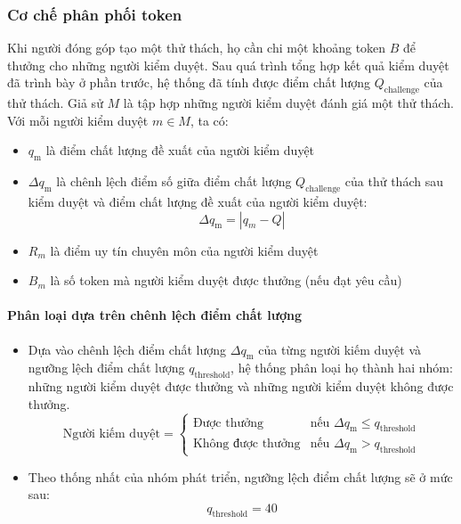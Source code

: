 \subsubsection{Cơ chế phân phối token}

Khi người đóng góp tạo một thử thách, họ cần chi một khoảng token $B$ để thưởng cho những người kiểm duyệt. Sau quá trình tổng hợp kết quả kiểm duyệt đã trình bày ở phần trước, hệ thống đã tính được điểm chất lượng $Q_{\text{challenge}}$ của thử thách. 
Giả sử $M$ là tập hợp những người kiểm duyệt đánh giá một thử thách. Với mỗi người kiểm duyệt $m \in M$, ta có:
\begin{itemize}
  \item $q_{\text{m}}$ là điểm chất lượng đề xuất của người kiểm duyệt 
  \item $\Delta q_{\text{m}}$ là chênh lệch điểm số giữa điểm chất lượng $Q_{\text{challenge}}$ của thử thách sau kiểm duyệt và điểm chất lượng đề xuất của người kiểm duyệt: 
    \[\Delta q_{\text{m}} = |q_{m}-Q|\]
  \item $R_{m}$ là điểm uy tín chuyên môn của người kiểm duyệt
  \item $B_{m}$ là số token mà người kiểm duyệt được thưởng (nếu đạt yêu cầu)
\end{itemize}

\paragraph{Phân loại dựa trên chênh lệch điểm chất lượng}
\begin{itemize}
  \item Dựa vào chênh lệch điểm chất lượng $\Delta q_{\text{m}}$ của từng người kiếm duyệt và ngưỡng lệch điểm chất lượng $q_{\text{threshold}}$, hệ thống phân loại họ thành hai nhóm: những người kiểm duyệt được thưởng và những người kiểm duyệt không được thưởng. 
    \[
    \text{Người kiếm duyệt} =
    \begin{cases}
      \text{Được thưởng} & \text{nếu } \Delta q_{\text{m}} \leq q_{\text{threshold}} \\
      \text{Không được thưởng} & \text{nếu } \Delta q_{\text{m}} > q_{\text{threshold}}
    \end{cases}
    \]
  \item Theo thống nhất của nhóm phát triển, ngưỡng lệch điểm chất lượng sẽ ở mức sau:
    \[q_{\text{threshold}} = 40 \]

\end{itemize}

